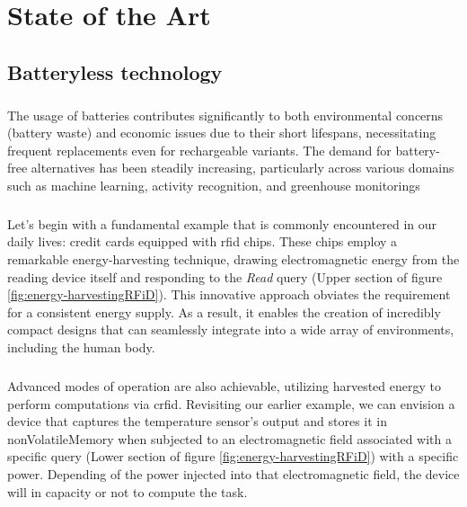 \chapter*{State of the Art}

\section*{Batteryless technology}
        
    \paragraph{}
        The usage of batteries contributes significantly to both environmental concerns (battery waste) and economic issues due to their short lifespans, necessitating frequent replacements even for rechargeable variants. The demand for battery-free alternatives has been steadily increasing, particularly across various domains such as machine learning, activity recognition, and greenhouse monitorings%

    \paragraph{}
        Let's begin with a fundamental example that is commonly encountered in our daily lives: credit cards equipped with \gls{rfid} chips.
        \newline
        These chips employ a remarkable energy-harvesting technique, drawing electromagnetic energy from the reading device itself and responding to the \textit{Read} query (Upper section of figure \ref{fig:energy-harvestingRFiD}). This innovative approach obviates the requirement for a consistent energy supply. As a result, it enables the creation of incredibly compact designs that can seamlessly integrate into a wide array of environments, including the human body.

    \paragraph{}
        Advanced modes of operation are also achievable, utilizing harvested energy to perform computations via \gls{crfid}. Revisiting our earlier example, we can envision a device that captures the temperature sensor's output and stores it in \gls{nonVolatileMemory} when subjected to an electromagnetic field associated with a specific query (Lower section of figure \ref{fig:energy-harvestingRFiD}) with a specific power.
        Depending of the power injected into that electromagnetic field, the device will in capacity or not to compute the task\cite{rfidEnergyAwareCheckpointing}.
    
